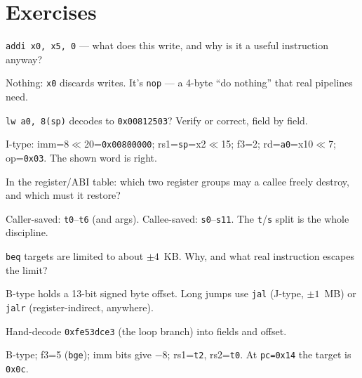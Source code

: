\section*{Exercises}
\label{sec:exercises03}

\begin{exercise}\label{ex:e03a}
\texttt{addi x0, x5, 0} --- what does this write, and why is it a
useful instruction anyway?
\end{exercise}
\begin{solution}[hint]
Nothing: \texttt{x0} discards writes. It's \texttt{nop} --- a 4-byte
``do nothing'' that real pipelines need.
\end{solution}

\begin{exercise}\label{ex:e03b}
\texttt{lw a0, 8(sp)} decodes to \texttt{0x00812503}? Verify or
correct, field by field.
\end{exercise}
\begin{solution}[hint]
I-type: imm=8$\ll$20=\texttt{0x00800000}; rs1=\texttt{sp}=x2$\ll$15;
f3=2; rd=\texttt{a0}=x10$\ll$7; op=\texttt{0x03}. The shown word is
right.
\end{solution}

\begin{exercise}\label{ex:e03c}
In the register/ABI table: which two register groups may a callee
freely destroy, and which must it restore?
\end{exercise}
\begin{solution}[hint]
Caller-saved: \texttt{t0}--\texttt{t6} (and args). Callee-saved:
\texttt{s0}--\texttt{s11}. The \texttt{t}/\texttt{s} split is the
whole discipline.
\end{solution}

\begin{exercise}\label{ex:e03d}
\texttt{beq} targets are limited to about $\pm4$~KB. Why, and what
real instruction escapes the limit?
\end{exercise}
\begin{solution}[hint]
B-type holds a 13-bit signed byte offset. Long jumps use \texttt{jal}
(J-type, $\pm1$~MB) or \texttt{jalr} (register-indirect, anywhere).
\end{solution}

\begin{exercise}\label{ex:m03a}
Hand-decode \texttt{0xfe53dce3} (the loop branch) into fields and
offset.
\end{exercise}
\begin{solution}[hint]
B-type; f3=5 (\texttt{bge}); imm bits give $-8$; rs1=\texttt{t2},
rs2=\texttt{t0}. At \texttt{pc=0x14} the target is \texttt{0x0c}.
\end{solution}

